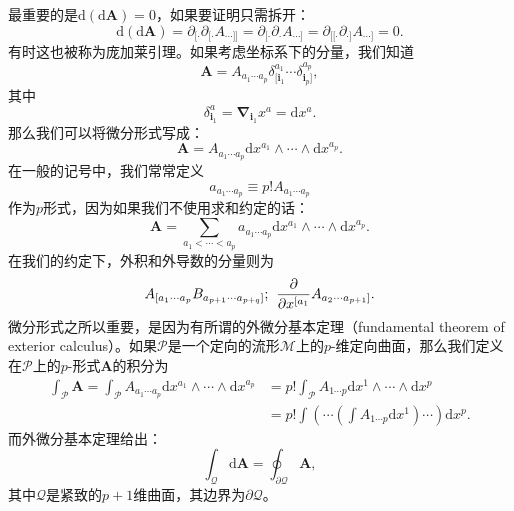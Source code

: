 最重要的是$\mathrm{d}(\mathrm{d}\boldsymbol{A}) =0$，如果要证明只需拆开：
\begin{equation*}
	\mathrm{d} (\mathrm{d}\boldsymbol{A} )=\partial _{[\cdot} \partial _{[\cdot} A_{\boldsymbol{\cdots }]]} =\partial _{[\cdot} \partial _{\cdot} A_{\boldsymbol{\cdots }]} =\partial _{[[\cdot} \partial _{\cdot]} A_{\boldsymbol{\cdots }]} =0.
\end{equation*}
有时这也被称为庞加莱引理。如果考虑坐标系下的分量，我们知道
\begin{equation*}
	\boldsymbol{A} =A_{a_{1} \cdots a_{p}} \delta _{[\boldsymbol{i}_{1}}^{a_{1}} \cdots \delta _{\boldsymbol{i}_{p}]}^{a_{p}} ,
\end{equation*}
其中
\begin{equation*}
	\delta _{\boldsymbol{i}_{1}}^{a} =\boldsymbol{\nabla }_{\boldsymbol{i}_{1}} x^{a} =\mathrm{d} x^{a} .
\end{equation*}
那么我们可以将微分形式写成：
\begin{equation*}
	\boldsymbol{A} =A_{a_{1} \cdots a_{p}}\mathrm{d} x^{a_{1}} \land \cdots \land \mathrm{d} x^{a_{p}} .
\end{equation*}
在一般的记号中，我们常常定义
\begin{equation*}
	a_{a_{1} \cdots a_{p}} \equiv p!A_{a_{1} \cdots a_{p}}
\end{equation*}
作为$p$形式，因为如果我们不使用求和约定的话：
\begin{equation*}
	\boldsymbol{A} =\sum _{a_{1} < \cdots < a_{p}} a_{a_{1} \cdots a_{p}}\mathrm{d} x^{a_{1}} \land \cdots \land \mathrm{d} x^{a_{p}} .
\end{equation*}
在我们的约定下，外积和外导数的分量则为
\begin{equation*}
	A_{[ a_{1} \cdots a_{p}} B_{a_{p+1} \cdots a_{p+q}]} ;\kern+0.4em \frac{\partial }{\partial x^{[ a_{1}}} A_{a_{2} \cdots a_{p+1}]} .
\end{equation*}
微分形式之所以重要，是因为有所谓的外微分基本定理（fundamental theorem of exterior calculus）。如果$\mathcal{P}$是一个定向的流形$\mathcal{M}$上的$p$-维定向曲面，那么我们定义在$\mathcal{P}$上的$p$-形式$\boldsymbol{A}$的积分为
\begin{equation*}
	\begin{aligned}
		\int _{\mathcal{P}}\boldsymbol{A} =\int _{\mathcal{P}} A_{a_{1} \cdots a_{p}}\mathrm{d} x^{a_{1}} \land \cdots \land \mathrm{d} x^{a_{p}} & =p!\int _{\mathcal{P}} A_{1\cdots p}\mathrm{d} x^{1} \land \cdots \land \mathrm{d} x^{p}\\
		& =p!\int \left( \cdots \left(\int A_{1\cdots p}\mathrm{d} x^{1}\right) \cdots \right)\mathrm{d} x^{p} .
	\end{aligned}
\end{equation*}
而外微分基本定理给出：
\begin{equation*}
	\int _{\mathcal{Q}}\mathrm{d}\boldsymbol{A} =\oint _{\partial \mathcal{Q}}\boldsymbol{A} ,
\end{equation*}
其中$\mathcal{Q}$是紧致的$p+1$维曲面，其边界为$\partial \mathcal{Q}$。


